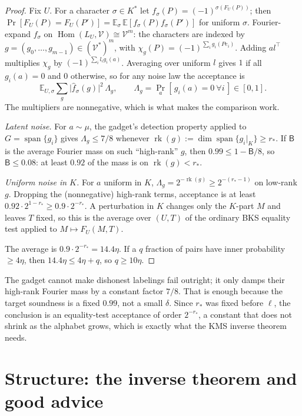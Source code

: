 \documentclass[11pt]{article}
\theoremstyle{definition}
\theoremstyle{remark}
\newcommand{\E}{\mathbb E}
\newcommand{\V}{\mathcal V}
\DeclareMathOperator{\Hom}{Hom}
\DeclareMathOperator{\Span}{span}
\newcommand{\abs}[1]{\lvert #1\rvert}
\begin{document}
\begin{proof}
Fix $U$. For a character $\sigma\in K^*$ let
$f_\sigma(P)=(-1)^{\sigma(F_U(P))}$; then
$\Pr[F_U(P)=F_U(P')]=\E_\sigma\,\E[f_\sigma(P)f_\sigma(P')]$ for uniform
$\sigma$. Fourier-expand $f_\sigma$ on $\Hom(L_U,\V)\cong\V^m$: the characters
are indexed by $g=(g_0,\dots,g_{m-1})\in(\V^*)^m$, with
$\chi_g(P)=(-1)^{\sum_ig_i(Pe_i)}$. Adding $al^\top$ multiplies $\chi_g$ by
$(-1)^{\sum_il_ig_i(a)}$. Averaging over uniform $l$ gives $1$ if all
$g_i(a)=0$ and $0$ otherwise, so for any noise law the acceptance is
\[
\E_{U,\sigma}\sum_g\abs{\widehat f_\sigma(g)}^2\,\Lambda_g,\qquad
\Lambda_g=\Pr_a[\,g_i(a)=0\ \forall i\,]\in[0,1].
\]
The multipliers are nonnegative, which is what makes the comparison work.

\emph{Latent noise.} For $a\sim\mu$, the gadget's detection property applied to
$G=\Span\{g_i\}$ gives $\Lambda_g\le7/8$ whenever
$\operatorname{rk}(g):=\dim\Span\{g_i|_K\}\ge r_*$. If $\mathsf{B}$ is the
average Fourier mass on such ``high-rank'' $g$, then $0.99\le1-\mathsf{B}/8$, so
$\mathsf{B}\le0.08$: at least $0.92$ of the mass is on $\operatorname{rk}(g)<r_*$.

\emph{Uniform noise in $K$.} For $a$ uniform in $K$,
$\Lambda_g=2^{-\operatorname{rk}(g)}\ge2^{-(r_*-1)}$ on low-rank $g$. Dropping
the (nonnegative) high-rank terms, acceptance is at least
$0.92\cdot2^{1-r_*}\ge0.9\cdot2^{-r_*}$. A perturbation in $K$ changes only the
$K$-part $M$ and leaves $T$ fixed, so this is the average over $(U,T)$ of the
ordinary BKS equality test applied to $M\mapsto F_U(M,T)$.

The average is $0.9\cdot2^{-r_*}=14.4\eta$. If a $q$ fraction of pairs have
inner probability $\ge4\eta$, then $14.4\eta\le4\eta+q$, so $q\ge10\eta$.
\end{proof}

\begin{idea}
The gadget cannot make dishonest labelings fail outright; it only damps their
high-rank Fourier mass by a constant factor $7/8$. That is enough because the
target soundness is a fixed $0.99$, not a small $\delta$. Since $r_*$ was fixed
before $\ell$, the conclusion is an equality-test acceptance of order
$2^{-r_*}$, a constant that does not shrink as the alphabet grows, which is
exactly what the KMS inverse theorem needs.
\end{idea}

\section{Structure: the inverse theorem and good advice}\label{sec:inverse}
\end{document}
